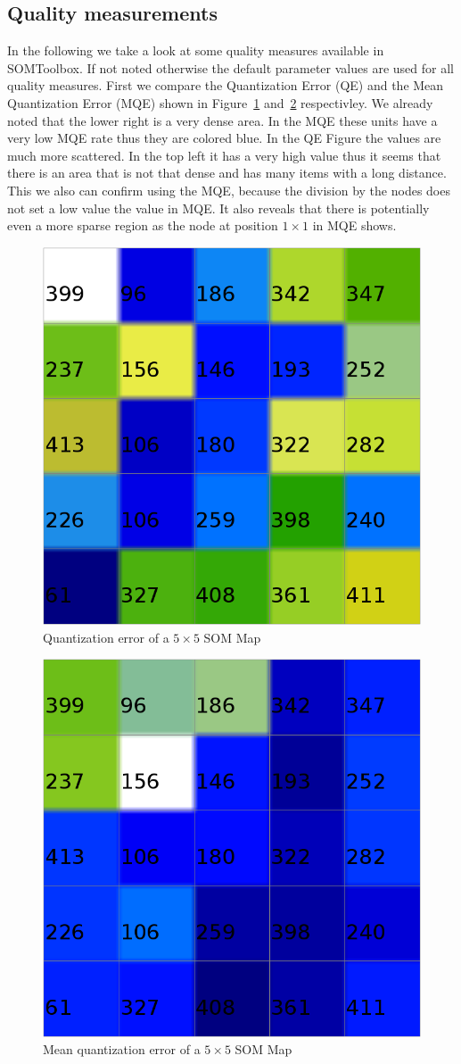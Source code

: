 \documentclass{acm_proc_article-sp}
\begin{document}
\subsection{Quality measurements}

In the following we take a look at some quality measures available in SOMToolbox.
If not noted otherwise the default parameter values are used for all quality measures.
First we compare the Quantization Error (QE) and the Mean Quantization Error (MQE) shown in
Figure~\ref{fig:wine-small-quant-error} and~\ref{fig:wine-small-mean-quant-error} respectivley.
We already noted that the lower right is a very dense area. In the MQE these units have a very low
MQE rate thus they are colored blue. In the QE Figure the values are much more scattered. In
the top left it has a very high value thus it seems that there is an area that is not that dense
and has many items with a long distance. This we also can confirm using the MQE, because the division
by the nodes does not set a low value the value in MQE. It also reveals that there is potentially even a more sparse
region as the node at position $1\times1$ in MQE shows.

\begin{figure}
\centering
\includegraphics[width=0.5\linewidth]{img/wine-small-quant-error}
\caption{Quantization error of a $5\times5$ SOM Map}
\label{fig:wine-small-quant-error}
\end{figure}

\begin{figure}
\centering
\includegraphics[width=0.5\linewidth]{img/wine-small-mean-quant-error}
\caption{Mean quantization error of a $5\times5$ SOM Map}
\label{fig:wine-small-mean-quant-error}
\end{figure}
\end{document}
